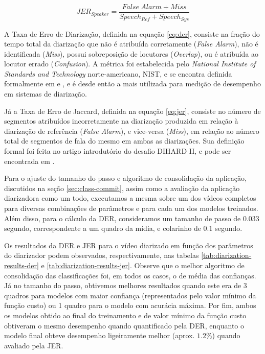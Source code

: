 \begin{equation}\label{eq:jer}
    JER_{Speaker} = \frac{False\ Alarm + Miss}{Speech_{Ref} + Speech_{Sys}}
\end{equation}

A Taxa de Erro de Diarização, definida na equação \ref{eq:der}, consiste na fração do tempo total da diarização que não é atribuída corretamente (\textit{False Alarm}), não é identificada (\textit{Miss}), possui sobreposição de locutores (\textit{Overlap}), ou é atribuída ao locutor errado (\textit{Confusion}).
A métrica foi estabelecida pelo \textit{National Institute of Standards and Technology} norte-americano, NIST, e se encontra definida formalmente em \cite{nist2009RT09Rich2009} e \cite{fiscusRichTranscription20062006}, e é desde então a mais utilizada para medição de desempenho em sistemas de diarização.

Já a Taxa de Erro de Jaccard, definida na equação \ref{eq:jer}, consiste no número de segmentos atribuídos incorretamente na diarização produzida em relação à diarização de referência (\textit{False Alarm}), e vice-versa (\textit{Miss}), em relação ao número total de segmentos de fala do mesmo em ambas as diarizações.
Sua definição formal foi feita no artigo introdutório do desafio DIHARD II, e pode ser encontrada em  \cite{ryantSecondDIHARDDiarization2019}.

Para o ajuste do tamanho do passo e algoritmo de consolidação da aplicação, discutidos na seção \ref{sec:class-commit}, assim como a avaliação da aplicação diarizadora como um todo, executamos a mesma sobre um dos vídeos completos para diversas combinações de parâmetros e para cada um dos modelos treinados. 
Além disso, para o cálculo da DER, consideramos um tamanho de passo de $0.033$ segundo, correspondente a um quadro da mídia, e colarinho de $0.1$ segundo.

Os resultados da DER e JER para o vídeo diarizado em função dos parâmetros do diarizador podem observados, respectivamente, nas tabelas \ref{tab:diarization-results-der} e \ref{tab:diarization-results-jer}.
Observe que o melhor algoritmo de consolidação das classificações foi, em todos os casos, o de média das confianças.
Já no tamanho do passo, obtivemos melhores resultados quando este era de 3 quadros para modelos com maior confiança (representados pelo valor mínimo da função custo) ou 1 quadro para o modelo com acurácia máxima.
Por fim, ambos os modelos obtido ao final do treinamento e de valor mínimo da função custo obtiveram o mesmo desempenho quando quantificado pela DER, enquanto o modelo final obteve desempenho ligeiramente melhor (aprox. $1.2\%$) quando avaliado pela JER.

